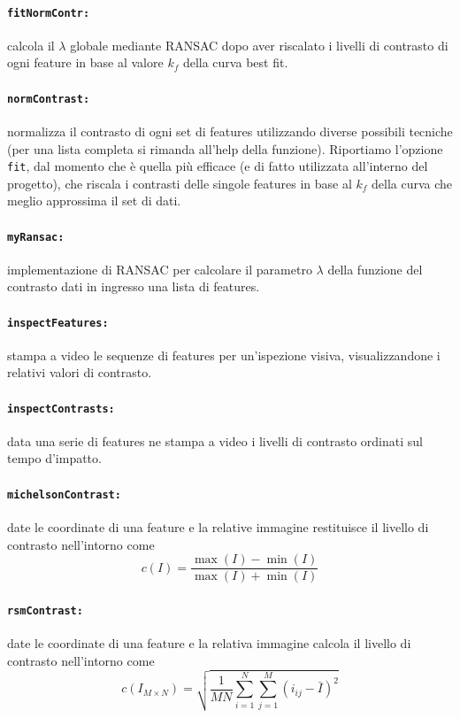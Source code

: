 \documentclass[12pt]{report}
\begin{document}
\paragraph*{\verb_fitNormContr:_} calcola il $\lambda$ globale mediante RANSAC dopo aver riscalato i livelli di contrasto di ogni feature in base al valore $k_f$ della curva best fit.

\paragraph*{\verb_normContrast:_} normalizza il contrasto di ogni set di features utilizzando diverse possibili tecniche (per una lista completa si rimanda all'help della funzione). Riportiamo l'opzione \verb|fit|, dal momento che \`e quella pi\`u efficace (e di fatto utilizzata all'interno del progetto), che riscala i contrasti delle singole features in base al $k_f$ della curva che meglio approssima il set di dati.

\paragraph*{\verb_myRansac:_} implementazione di RANSAC per calcolare il parametro $\lambda$ della funzione del contrasto dati in ingresso una lista di features.

\paragraph*{\verb_inspectFeatures:_} stampa a video le sequenze di features per un'ispezione visiva, visualizzandone i relativi valori di contrasto.

\paragraph*{\verb_inspectContrasts:_} data una serie di features ne stampa a video i livelli di contrasto ordinati sul tempo d'impatto.

\paragraph*{\verb_michelsonContrast:_} date le coordinate di una feature e la relative immagine restituisce il livello di contrasto nell'intorno come $$c\left(I\right) = \frac{\max(I)-\min(I)}{\max(I)+\min(I)}$$

\paragraph*{\verb_rsmContrast:_} date le coordinate di una feature e la relativa immagine calcola il livello di contrasto nell'intorno come $$ c\left(I_{M\times N}\right) = \sqrt{\frac{1}{MN}\sum_{i=1}^N\sum_{j=1}^M(i_{ij}-\bar{I})^2} $$
\end{document}
